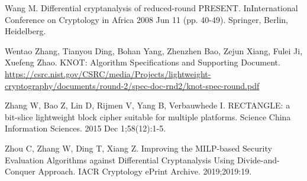 \begin{thebibliography}{8}
Wang M. Differential cryptanalysis of reduced-round PRESENT. InInternational Conference on Cryptology in Africa 2008 Jun 11 (pp. 40-49). Springer, Berlin, Heidelberg.

Wentao Zhang, Tianyou Ding, Bohan Yang, Zhenzhen Bao, Zejun Xiang, Fulei Ji, Xuefeng Zhao. KNOT: Algorithm Specifications and Supporting Document. \url{https://csrc.nist.gov/CSRC/media/Projects/lightweight-cryptography/documents/round-2/spec-doc-rnd2/knot-spec-round.pdf}

Zhang W, Bao Z, Lin D, Rijmen V, Yang B, Verbauwhede I. RECTANGLE: a bit-slice lightweight block cipher suitable for multiple platforms. Science China Information Sciences. 2015 Dec 1;58(12):1-5.

Zhou C, Zhang W, Ding T, Xiang Z. Improving the MILP-based Security Evaluation Algorithms against Differential Cryptanalysis Using Divide-and-Conquer Approach. IACR Cryptology ePrint Archive. 2019;2019:19.





\end{thebibliography}